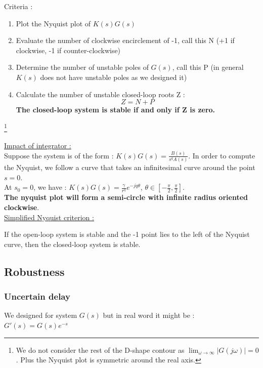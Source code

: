 \documentclass[../main.tex]{subfiles}
\begin{document}
Criteria : \begin{enumerate}
    \item Plot the Nyquist plot of $K(s)G(s)$\\
    \item Evaluate the number of clockwise encirclement of -1, call this N (+1 if clockwise, -1 if counter-clockwise)\\
    \item Determine the number of unstable poles of $G(s)$, call this P (in general $K(s)$ does not have unstable poles as we designed it)\\
    \item Calculate the number of unstable closed-loop roots Z : \begin{equation}
        Z = N+P
    \end{equation}
    \textbf{The closed-loop system is stable if and only if Z is zero.}\\
\end{enumerate}

\footnote{We do not consider the rest of the D-shape contour as $\lim_{\omega \rightarrow \infty} \lvert G(j\omega) \rvert = 0$. Plus the Nyquist plot is symmetric around the real axis.}

\quad \underline{Impact of integrator :}\\
Suppose the system is of the form : $K(s) G(s) = \frac{B(s)}{s^qA(s)}$. In order to compute the Nyquist, we follow a curve that takes an infinitesimal curve around the point $s=0$.\\

At $s_0=0$, we have : $K(s)G(s) = \frac{\gamma}{r^q}e^{-jq\theta}$, $\theta \in [-\frac{\pi}{2}, \frac{\pi}{2}]$.\\
\textbf{The nyquist plot will form a semi-circle with infinite radius oriented clockwise}.\\

\quad \underline{Simplified Nyquist criterion :}\\
\begin{theorem}
    If the open-loop system is stable and the -1 point lies to the left of the Nyquist curve, then the closed-loop system is stable.
\end{theorem}

\subsection{Robustness}
\subsubsection{Uncertain delay}
We designed for system $G(s)$ but in real word it might be : $G'(s) = G(s)e^{-s}$\\
\end{document}
